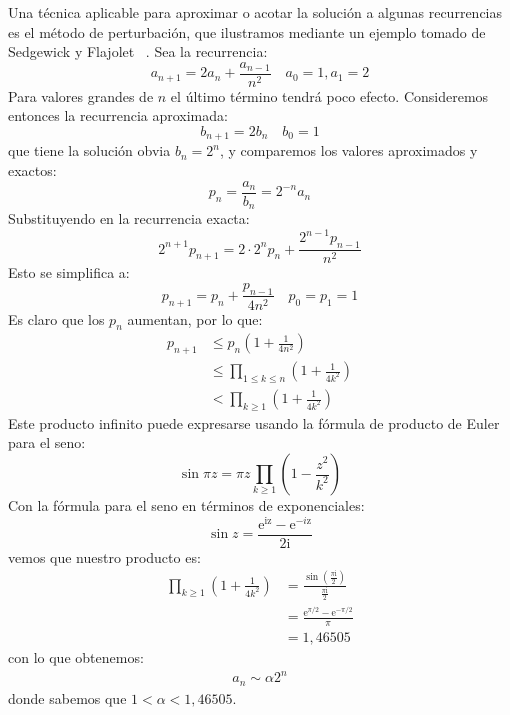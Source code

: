   Una técnica aplicable para aproximar o acotar
  la solución a algunas recurrencias es el método de perturbación,
  que ilustramos mediante un ejemplo tomado de Sedgewick y Flajolet~%
    \cite{sedgewick13:_introd_anal_algor}.
  Sea la recurrencia:
  \begin{equation*}
    a_{n + 1}
      = 2 a_n + \frac{a_{n - 1}}{n^2}
      \quad a_0 = 1, a_1 = 2
  \end{equation*}
  Para valores grandes de \(n\)
  el último término tendrá poco efecto.
  Consideremos entonces la recurrencia aproximada:
  \begin{equation*}
    b_{n + 1}
      = 2 b_n
      \quad b_0 = 1
  \end{equation*}
  que tiene la solución obvia \(b_n = 2^n\),
  y comparemos los valores aproximados y exactos:
  \begin{equation*}
    p_n
      = \frac{a_n}{b_n}
      = 2^{-n} a_n
  \end{equation*}
  Substituyendo en la recurrencia exacta:
  \begin{equation*}
    2^{n + 1} p_{n + 1}
      = 2 \cdot 2^n p_n + \frac{2^{n - 1} p_{n - 1}}{n^2}
  \end{equation*}
  Esto se simplifica a:
  \begin{equation*}
    p_{n + 1}
      = p_n + \frac{p_{n - 1}}{4 n^2}
      \quad p_0 = p_1 = 1
  \end{equation*}
  Es claro que los \(p_n\) aumentan,
  por lo que:
  \begin{align*}
    p_{n + 1}
      &\le p_n \left( 1 + \frac{1}{4 n^2} \right) \\
      &\le \prod_{1 \le k \le n} \left( 1 + \frac{1}{4 k^2} \right) \\
      &<   \prod_{k \ge 1} \left( 1 + \frac{1}{4 k^2} \right)
  \end{align*}
  Este producto infinito
  puede expresarse usando la fórmula de producto de Euler para el seno:
  \begin{equation*}
    \sin \pi z
      = \pi z \prod_{k \ge 1} \left( 1 - \frac{z^2}{k^2} \right)
  \end{equation*}
  Con la fórmula para el seno en términos de exponenciales:
  \begin{equation*}
    \sin z
      = \frac{\mathrm{e^{\mathrm{i} z}} - \mathrm{e^{- \mathit{i} z}}}
             {2 \mathrm{i}}
  \end{equation*}
  vemos que nuestro producto es:
  \begin{align*}
    \prod_{k \ge 1} \left( 1 + \frac{1}{4 k^2} \right)
      &= \frac{\sin\left( \frac{\pi \mathrm{i}}{2} \right)}
              {\frac{\pi \mathrm{i}}{2}} \\
      &= \frac{\mathrm{e}^{\pi / 2} - \mathrm{e}^{- \pi / 2}}{\pi} \\
      &= 1,46505
  \end{align*}
  con lo que obtenemos:
  \begin{align*}
    a_n
      \sim \alpha 2^n
  \end{align*}
  donde sabemos que \(1 < \alpha < 1,46505\).






